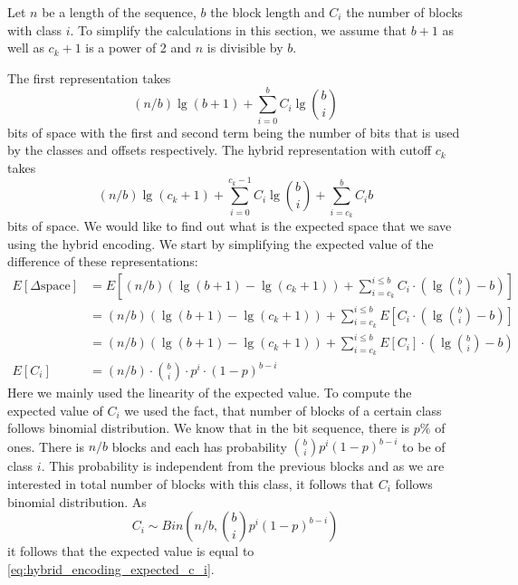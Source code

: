 Let $n$ be a length of the
sequence, $b$ the block length and $C_i$ the number of blocks with class $i$. To simplify the
calculations in this section, we assume that $b+1$ as well as $c_k+1$ is a power of 2 and
$n$ is divisible by $b$.

The first representation takes $$(n/b)\lg (b+1) + \sum_{i=0}^{b} C_i\lg {b\choose i}$$
bits of space with the first and second term being the number of bits that is used by the
classes and offsets respectively. The hybrid representation with cutoff $c_k$ takes
$$(n/b)\lg (c_k+1) + \sum_{i=0}^{c_k-1}C_i\lg {b\choose i} + \sum_{i=c_k}^{b}C_i b$$
bits of space. We would like to find out what is the expected space that we save using the
hybrid encoding. We start by simplifying the expected value of the difference of these
representations:
\begin{align}
E[\Delta\text{space}] &= E\left[(n/b)(\lg(b+1)-\lg(c_k+1)) + \sum_{i=c_k}^{i\leq b}C_i\cdot \left(\lg{b\choose i} - b\right)\right] \nonumber\\
&=(n/b)(\lg(b+1)-\lg(c_k+1)) + \sum_{i=c_k}^{i\leq b}E\left[C_i\cdot \left(\lg{b\choose i} - b\right)\right] \nonumber\\
&=(n/b)(\lg(b+1)-\lg(c_k+1)) + \sum_{i=c_k}^{i\leq b}E\left[C_i\right]\cdot \left(\lg{b\choose i} - b\right) \nonumber\\
E[C_i] &= (n/b)\cdot {b\choose i}\cdot p^i\cdot (1-p)^{b-i} \label{eq:hybrid_encoding_expected_c_i}
\end{align}
Here we mainly used the linearity of the expected value. To compute the expected value of
$C_i$ we used the fact, that number of blocks of a certain class follows binomial
distribution. We know that in the bit sequence, there is $p\%$ of ones. There is $n/b$ blocks
and each has probability ${b\choose i}p^i(1-p)^{b-i}$ to be of class $i$. This probability
is independent from the previous blocks and as we are interested in total number of blocks with
this class, it follows that $C_i$ follows binomial distribution. As
$$C_i \sim Bin\left(n/b, {b\choose i}p^i(1-p)^{b-i}\right)$$ it follows that the expected value
is equal to \ref{eq:hybrid_encoding_expected_c_i}.

